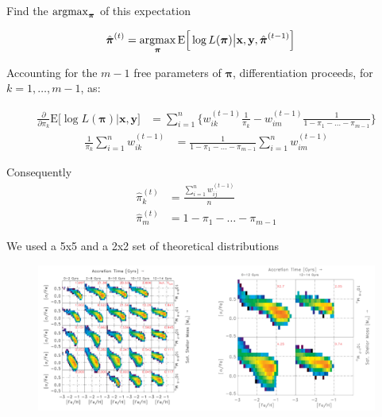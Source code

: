 \documentclass{beamer}
\newcommand{\eqn}[1]{\begin{align*}
#1
\end{align*}}
\newcommand{\vect}[1]{\boldsymbol{\mathbf{#1}}}
\newcommand{\Bl}{\Big\{}
\newcommand{\Br}{\Big\}}
\newcommand{\argmax}{\operatornamewithlimits{argmax}}
\newcommand{\vx}{\vect{x}}
\newcommand{\vy}{\vect{y}}
\newcommand{\vp}{\vect{\pi}}
\newcommand{\vph}{\hat{\vect{\pi}}}
\newcommand{\sumn}{\sum^n_{i=1}}
\newcommand{\llp}{\log L(\vp)}
\begin{document}
\begin{frame}{Find the $\argmax_{\vp}$ of this expectation}
	
	
	\eqn{
		\vph^{(t)} &= \argmax_{\vp} \text{E}\Big[\llp \big| \vx,\vy,\vph^{(t-1)} \Big]   
	}
	
	Accounting for the $m-1$ free parameters of $\vp$, differentiation proceeds, for $k=1,\ldots,m-1$, as:
	
	\eqn{
		\frac{\partial}{\partial \pi_k} \text{E}\Big[\llp \big| \vect{x},\vect{y}\Big]   &=      \sumn \Bl  w^{(t-1)}_{ik} \frac{1}{\pi_k} - w^{(t-1)}_{im} \frac{1}{1-\pi_1-\ldots-\pi_{m-1}}   \Br
	}
	\eqn{
		\frac{1}{\pi_k} \sumn w_{ik}^{(t-1)} &= \frac{1}{1-\pi_1-\ldots-\pi_{m-1}} \sumn w_{im}^{(t-1)}
	}
	
	Consequently
	\eqn{
		\hat{\pi}^{(t)}_k &= \frac{\sumn w^{(t-1)}_{ij}}{n}	\\
		\hat{\pi}^{(t)}_m &= 1-\pi_1-\ldots-\pi_{m-1}
	}
	
\end{frame}




\begin{frame}{We used a 5x5 and a 2x2 set of theoretical distributions}
		
	\begin{figure}
			\begin{center}
				\includegraphics[width=\textwidth]{ourdens.pdf}
			\end{center}
	\end{figure}
	
	
	
	
\end{frame}
\end{document}
